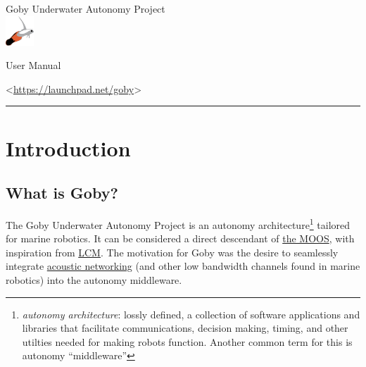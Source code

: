 \documentclass[11pt, letterpaper, oneside]{memoir}
\begin{document}
\begin{center}
\begin{Large}
Goby Underwater Autonomy Project\\
\vspace{0.5em}
\includegraphics[height=3em]{gobysoft_logo_image_only.eps} \\
\vspace{0.5em}
\end{Large}
\begin{LARGE}
User Manual\\
\vspace{0.5em}
\end{LARGE}
<\url{https://launchpad.net/goby}>



\end{center}
\vspace{0.5em}
\rule{\textwidth}{1pt}

\vspace{0.5em}

\tableofcontents

{}
\bvnumbersoutside
\linenumberfont{\normalfont\tiny}
\setsecheadstyle{\Large\raggedright}
\setsubsecheadstyle{\large\raggedright}
\setsubsubsecheadstyle{\itshape\raggedright}
\setparaheadstyle{\itshape\raggedright}
\setsubparaheadstyle{\itshape\raggedright}

\hangsecnum


\chapter{Introduction}

\section{What is Goby?}

The Goby Underwater Autonomy Project is an autonomy architecture\footnote{\textit{autonomy architecture}: lossly defined, a collection of software applications and libraries that facilitate communications, decision making, timing, and other utilties needed for making robots function. Another common term for this is autonomy ``middleware''} tailored for marine robotics. It can be considered a direct descendant of \href{http://www.robots.ox.ac.uk/~mobile/MOOS/wiki/pmwiki.php}{the MOOS}, with inspiration from  \href{http://code.google.com/p/lcm/}{LCM}. The motivation for Goby was the desire to seamlessly integrate \href{http://gobysoft.com/doc/acomms.html}{acoustic networking} (and other low bandwidth channels found in marine robotics) into the autonomy middleware.
\end{document}

